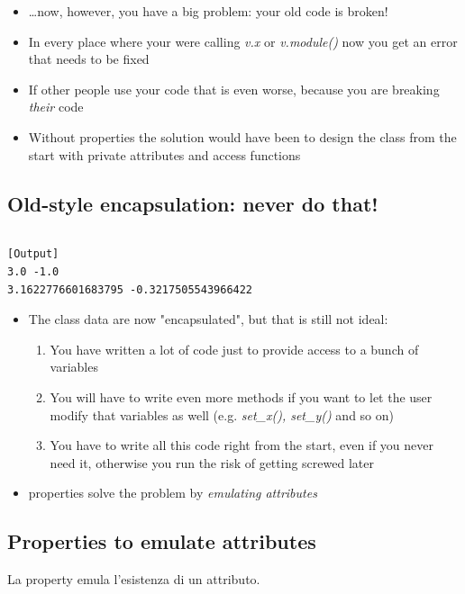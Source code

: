   \begin{itemize}
    \item \dots now, however, you have a big problem: your old code is broken!
    \item In every place where your were calling \emph{v.x} or \emph{v.module()}
          now you get an error that needs to be fixed
    \item If other people use your code that is even worse, because you are breaking \emph{their} code
    \item Without properties the solution would have been to design the class from
          the start with private attributes and access functions
  \end{itemize}

\subsection{Old-style encapsulation: never do that!}


\inputminted{python}{snippets/vector2d_old_enc.py}

\begin{verbatim}
[Output]
3.0 -1.0
3.1622776601683795 -0.3217505543966422
\end{verbatim}
  \begin{itemize}
    \item The class data are now "encapsulated", but that is still not ideal:
    \begin{enumerate}
    \item You have written a lot of code just to provide access to a bunch of
          variables
    \item You will have to write even more methods if you want to let the user
          modify that variables as well (e.g. \emph{set\_x(), set\_y()} and so on)
    \item You have to write all this code right from the start, even if you 
          never need it, otherwise you run the risk of getting screwed later
    \end{enumerate}
    \item \alert{properties} solve the problem by \emph{emulating attributes}
  \end{itemize}

\subsection{Properties to emulate attributes}
La property emula l'esistenza di un attributo.

